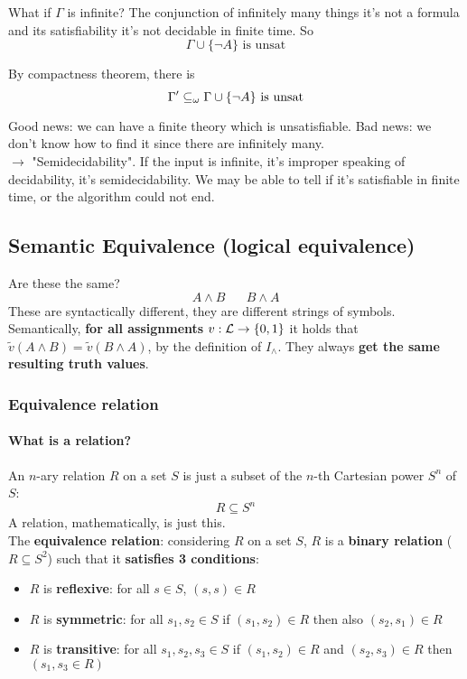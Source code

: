 \documentclass[11pt]{article}
\begin{document}
	What if $\Gamma$ is infinite? The conjunction of infinitely many things it's not a formula and its satisfiability it's not decidable in finite time. So 
	$$ \Gamma  \cup \{\neg A\} \text{ is unsat}$$
	
	By compactness theorem, there is
	$$ \Gamma' \subseteq_\omega \Gamma \cup \{\neg A\} \text{ is unsat} $$
	
	Good news: we can have a finite theory which is unsatisfiable. Bad news: we don't know how to find it since there are infinitely many.\\
	$\rightarrow$ "Semidecidability". If the input is infinite, it's improper speaking of decidability, it's semidecidability. We may be able to tell if it's satisfiable in finite time, or the algorithm could not end.\\
	
	\newpage
	
	\subsection{Semantic Equivalence (logical equivalence)}
	
	Are these the same?
	$$ A \wedge B \;\;\;\;\;\; B \wedge A $$
	These are syntactically different, they are different strings of symbols.\\
	
	Semantically, \textbf{for all assignments} $v: \mathcal{L} \rightarrow \{0,1\}$ it holds that $\tilde{v} (A \wedge B) = \tilde{v} (B \wedge A)$, by the definition of $I_\wedge$. They always \textbf{get the same resulting truth values}.\\
	
	\subsubsection{Equivalence relation}
	
	\paragraph{What is a relation?} An $n$-ary relation $R$ on a set $S$ is just a subset of the $n$-th Cartesian power $S^n$ of $S$:
	$$ R \subseteq S^n$$
	A relation, mathematically, is just this.\\
	
	The \textbf{equivalence relation}: considering $R$ on a set $S$, $R$ is a \textbf{binary relation} ($R \subseteq S^2$) such that it \textbf{satisfies 3 conditions}:
	\begin{itemize}
		\item $R$ is \textbf{reflexive}: for all $s \in S$, $(s,s) \in R$
		\item $R$ is \textbf{symmetric}: for all $s_1, s_2 \in S$ if $(s_1, s_2) \in R$ then also $(s_2, s_1) \in R$
		\item $R$ is \textbf{transitive}: for all $s_1, s_2, s_3 \in S$ if $(s_1, s_2) \in R$ and $(s_2, s_3) \in R$ then $(s_1, s_3 \in R)$
	\end{itemize}
	
\end{document}
